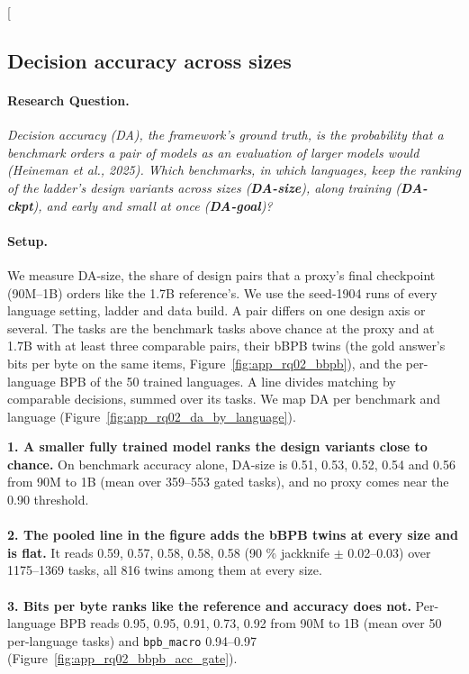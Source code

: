 \clearpage
\twocolumn[{%
\rqparent
\subsection{Decision accuracy across sizes}
\label{app:rq02_decision_accuracy}

\noindent\begin{minipage}[t]{0.485\textwidth}
\vspace{0pt}
\paragraph{Research Question.} \emph{Decision accuracy (DA), the framework's ground truth, is the probability that a benchmark orders a pair of models as an evaluation of larger models would (Heineman et al., 2025). Which benchmarks, in which languages, keep the ranking of the ladder's design variants across sizes (\textbf{DA-size}), along training (\textbf{DA-ckpt}), and early \emph{and} small at once (\textbf{DA-goal})?}

\paragraph{Setup.} We measure DA-size, the share of design pairs that a proxy's final checkpoint (90M--1B) orders like the 1.7B reference's. We use the seed-1904 runs of every language setting, ladder and data build. A pair differs on one design axis or several. The tasks are the benchmark tasks above chance at the proxy and at 1.7B with at least three comparable pairs, their bBPB twins (the gold answer's bits per byte on the same items, Figure~\ref{fig:app_rq02_bbpb}), and the per-language BPB of the 50 trained languages. A line divides matching by comparable decisions, summed over its tasks. We map DA per benchmark and language (Figure~\ref{fig:app_rq02_da_by_language}).
\end{minipage}\hfill
\begin{minipage}[t]{0.485\textwidth}
\vspace{0pt}
\begin{rqfinding}
\textbf{1. A smaller fully trained model ranks the design variants close to chance.} On benchmark accuracy alone, DA-size is 0.51, 0.53, 0.52, 0.54 and 0.56 from 90M to 1B (mean over 359--553 gated tasks), and no proxy comes near the 0.90 threshold.
\\
\\
\textbf{2. The pooled line in the figure adds the bBPB twins at every size and is flat.} It reads 0.59, 0.57, 0.58, 0.58, 0.58 (90 \% jackknife $\pm$ 0.02--0.03) over 1175--1369 tasks, all 816 twins among them at every size.
\\
\\
\textbf{3. Bits per byte ranks like the reference and accuracy does not.} Per-language BPB reads 0.95, 0.95, 0.91, 0.73, 0.92 from 90M to 1B (mean over 50 per-language tasks) and \texttt{bpb\_macro} 0.94--0.97 (Figure~\ref{fig:app_rq02_bbpb_acc_gate}).
\end{rqfinding}
\end{minipage}

}
